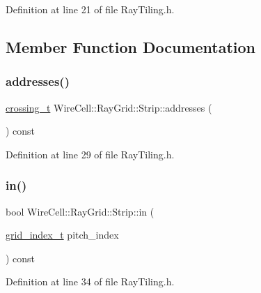 Definition at line 21 of file Ray\+Tiling.\+h.



\subsection{Member Function Documentation}
\mbox{\label{struct_wire_cell_1_1_ray_grid_1_1_strip_af63704a302c0546741e404597b3525a1}} 
\subsubsection{\texorpdfstring{addresses()}{addresses()}}
{\footnotesize\ttfamily \hyperlink{namespace_wire_cell_1_1_ray_grid_ad8870c962588c4492b1f7c5ad1552a7e}{crossing\+\_\+t} Wire\+Cell\+::\+Ray\+Grid\+::\+Strip\+::addresses (\begin{DoxyParamCaption}{ }\end{DoxyParamCaption}) const\hspace{0.3cm}{\ttfamily [inline]}}



Definition at line 29 of file Ray\+Tiling.\+h.

\mbox{\label{struct_wire_cell_1_1_ray_grid_1_1_strip_af466f06e09261f5e227dce9dd9db21db}} 
\subsubsection{\texorpdfstring{in()}{in()}}
{\footnotesize\ttfamily bool Wire\+Cell\+::\+Ray\+Grid\+::\+Strip\+::in (\begin{DoxyParamCaption}\item[{\hyperlink{namespace_wire_cell_1_1_ray_grid_ae97b5b26d015cd99f7d4566f3a7310d0}{grid\+\_\+index\+\_\+t}}]{pitch\+\_\+index }\end{DoxyParamCaption}) const\hspace{0.3cm}{\ttfamily [inline]}}



Definition at line 34 of file Ray\+Tiling.\+h.

